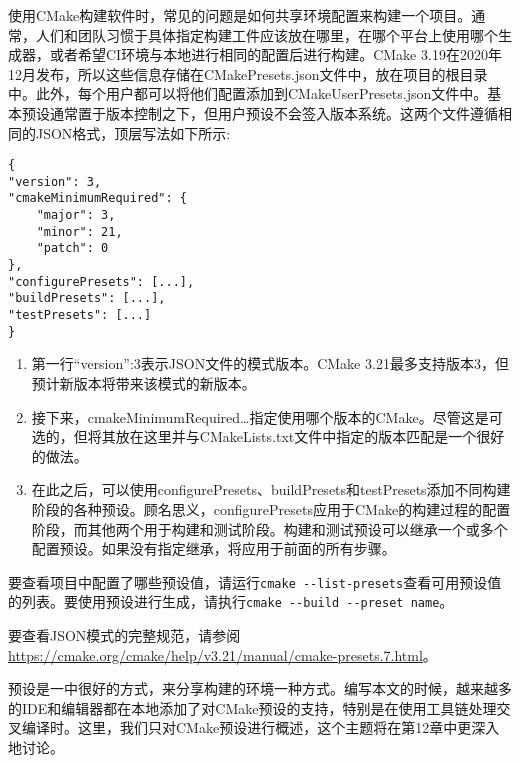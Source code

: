 使用CMake构建软件时，常见的问题是如何共享环境配置来构建一个项目。通常，人们和团队习惯于具体指定构建工件应该放在哪里，在哪个平台上使用哪个生成器，或者希望CI环境与本地进行相同的配置后进行构建。CMake 3.19在2020年12月发布，所以这些信息存储在CMakePresets.json文件中，放在项目的根目录中。此外，每个用户都可以将他们配置添加到CMakeUserPresets.json文件中。基本预设通常置于版本控制之下，但用户预设不会签入版本系统。这两个文件遵循相同的JSON格式，顶层写法如下所示:

\begin{lstlisting}[style=styleCMake]
{
"version": 3,
"cmakeMinimumRequired": {
	"major": 3,
	"minor": 21,
	"patch": 0
},
"configurePresets": [...],
"buildPresets": [...],
"testPresets": [...]
}
\end{lstlisting}

\begin{enumerate}
\item 
第一行“version”:3表示JSON文件的模式版本。CMake 3.21最多支持版本3，但预计新版本将带来该模式的新版本。

\item 
接下来，cmakeMinimumRequired{…}指定使用哪个版本的CMake。尽管这是可选的，但将其放在这里并与CMakeLists.txt文件中指定的版本匹配是一个很好的做法。

\item 
在此之后，可以使用configurePresets、buildPresets和testPresets添加不同构建阶段的各种预设。顾名思义，configurePresets应用于CMake的构建过程的配置阶段，而其他两个用于构建和测试阶段。构建和测试预设可以继承一个或多个配置预设。如果没有指定继承，将应用于前面的所有步骤。
\end{enumerate}

要查看项目中配置了哪些预设值，请运行\texttt{cmake -{}-list-presets}查看可用预设值的列表。要使用预设进行生成，请执行\texttt{cmake -{}-build -{}-preset name}。

要查看JSON模式的完整规范，请参阅\url{https://cmake.org/cmake/help/v3.21/manual/cmake-presets.7.html}。

预设是一中很好的方式，来分享构建的环境一种方式。编写本文的时候，越来越多的IDE和编辑器都在本地添加了对CMake预设的支持，特别是在使用工具链处理交叉编译时。这里，我们只对CMake预设进行概述，这个主题将在第12章中更深入地讨论。









































